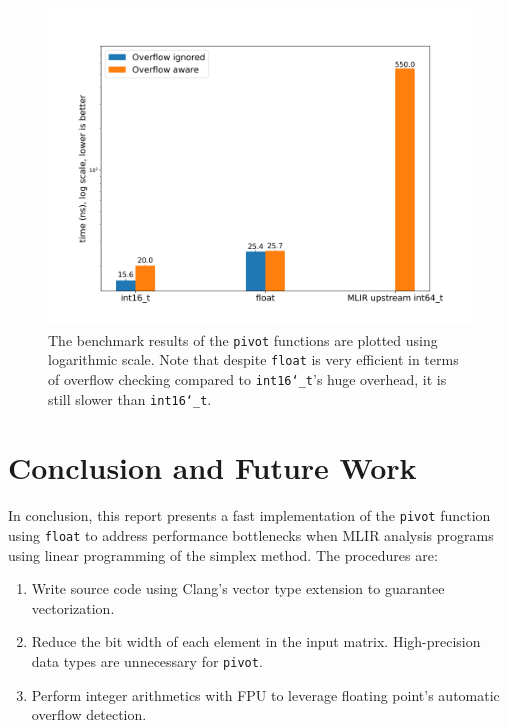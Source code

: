 \documentclass[logo,bsc,singlespacing,parskip]{infthesis}
\newcommand{\dtshort}{\texttt{int16\char`_t}}
\newcommand{\dtfloat}{\texttt{float}}
\newcommand{\pivot}{\texttt{pivot}}
\begin{document}
\begin{figure}[H]
    \begin{center}
        \includegraphics[width=\linewidth]{image/i16-3ymmf32-upstream-overflow.png}
    \end{center}
    \caption{ The benchmark results of the \pivot{} functions are plotted using logarithmic scale. Note that despite \dtfloat{} is very efficient in terms of overflow checking compared to \dtshort{}'s huge overhead, it is still slower than \dtshort{}.
    }

    \label{fig:i16-3ymmf32-upstream-overflow}
\end{figure}





\chapter{Conclusion and Future Work}

In conclusion, this report presents a fast implementation of the \pivot{} function using \dtfloat{} to address performance bottlenecks when MLIR analysis programs using linear programming of the simplex method. The procedures are: 
\begin{enumerate}
    \item Write source code using Clang's vector type extension to guarantee
    vectorization.
    \item Reduce the bit width of each element in the input matrix.
    High-precision data types are unnecessary for \pivot{}.
    \item Perform integer arithmetics with FPU to leverage floating point's
    automatic overflow detection.
\end{enumerate}
\end{document}
